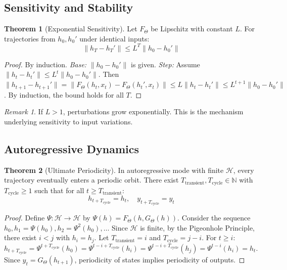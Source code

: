 \documentclass[11pt]{article}
\theoremstyle{definition}
\newtheorem{theorem}{Theorem}[section]
\theoremstyle{remark}
\newtheorem{remark}{Remark}[section]
\begin{document}
\subsection{Sensitivity and Stability}

\begin{theorem}[Exponential Sensitivity]
Let $F_\Theta$ be Lipschitz with constant $L$. For trajectories from $h_0, h_0'$ under identical inputs:
\begin{equation}
\|h_T - h_T'\| \leq L^T \|h_0 - h_0'\|
\end{equation}
\end{theorem}

\begin{proof}
By induction. \emph{Base:} $\|h_0 - h_0'\|$ is given. \emph{Step:} Assume $\|h_t - h_t'\| \leq L^t \|h_0 - h_0'\|$. Then $\|h_{t+1} - h_{t+1}'\| = \|F_\Theta(h_t, x_t) - F_\Theta(h_t', x_t)\| \leq L\|h_t - h_t'\| \leq L^{t+1}\|h_0 - h_0'\|$. By induction, the bound holds for all $T$.
\end{proof}

\begin{remark}
If $L > 1$, perturbations grow exponentially. This is the mechanism underlying sensitivity to input variations.
\end{remark}

\subsection{Autoregressive Dynamics}

\begin{theorem}[Ultimate Periodicity]
In autoregressive mode with finite $\mathcal{H}$, every trajectory eventually enters a periodic orbit. There exist $T_{\text{transient}}, T_{\text{cycle}} \in \mathbb{N}$ with $T_{\text{cycle}} \geq 1$ such that for all $t \geq T_{\text{transient}}$:
\begin{equation}
h_{t + T_{\text{cycle}}} = h_t, \quad y_{t + T_{\text{cycle}}} = y_t
\end{equation}
\end{theorem}

\begin{proof}
Define $\Psi: \mathcal{H} \to \mathcal{H}$ by $\Psi(h) = F_\Theta(h, G_\Theta(h))$. Consider the sequence $h_0, h_1 = \Psi(h_0), h_2 = \Psi^2(h_0), \ldots$ Since $\mathcal{H}$ is finite, by the Pigeonhole Principle, there exist $i < j$ with $h_i = h_j$. Let $T_{\text{transient}} = i$ and $T_{\text{cycle}} = j - i$. For $t \geq i$: $h_{t + T_{\text{cycle}}} = \Psi^{t + T_{\text{cycle}}}(h_0) = \Psi^{t - i + T_{\text{cycle}}}(h_i) = \Psi^{t - i + T_{\text{cycle}}}(h_j) = \Psi^{t - i}(h_i) = h_t$. Since $y_t = G_\Theta(h_{t+1})$, periodicity of states implies periodicity of outputs.
\end{proof}
\end{document}
